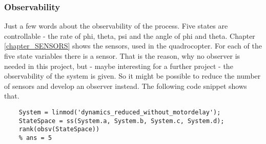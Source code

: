 \subsubsection{Observability}\label{chapter_observabilityIMPL}

Just a few words about the observability of the process. Five states are controllable - the rate of phi, theta, psi and the angle of phi and theta. Chapter \ref{chapter_SENSORS} shows the sensors, used in the quadrocopter. For each of the five state variables there is a sensor. That is the reason, why no observer is needed in this project, but - maybe interesting for a further project - the observability of the system is given. So it might be possible to reduce the number of sensors and develop an observer instead. The following code snippet shows that.

\begin{lstlisting}
	System = linmod('dynamics_reduced_without_motordelay');
	StateSpace = ss(System.a, System.b, System.c, System.d);
	rank(obsv(StateSpace)) 
	% ans = 5                 
\end{lstlisting}